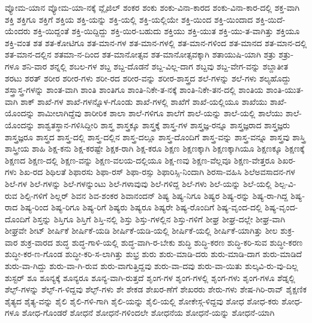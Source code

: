 {ವ್ಯೋಮ-ಯಾನ
ವ್ಯೋಮ-ಯಾ-ನಕ್ಕೆ
ವ್ಲೈಜಿಲ್
ಶಂಕರ
ಶಂಕು
ಶಂಕು-ವಿನಾ-ಕಾರದ
ಶಂಕು-ವಿನಾ-ಕಾರ-ದಲ್ಲಿ
ಶಕ್ತ-ವಾಗಿ
ಶಕ್ತಿ
ಶಕ್ತಿಗೂ
ಶಕ್ತಿಗೆ
ಶಕ್ತಿಯ
ಶಕ್ತಿ-ಯನ್ನು
ಶಕ್ತಿ-ಯಲ್ಲಿ
ಶಕ್ತಿ-ಯಲ್ಲಿಯೇ
ಶಕ್ತಿ-ಯಿಂದ
ಶಕ್ತಿ-ಯಿಂದಾದ
ಶಕ್ತಿ-ಯಿದೆ-ಯೆಂದರು
ಶಕ್ತಿ-ಯಿದ್ದಂತೆ
ಶಕ್ತಿ-ಯಿದ್ದಿದ್ದು
ಶಕ್ತಿ-ಯಿರ-ಬಹುದು
ಶಕ್ತಿಯು
ಶಕ್ತಿ-ಯುತ
ಶಕ್ತಿ-ಯು-ತ-ವಾಗಿತ್ತು
ಶಕ್ತಿಯೂ
ಶಕ್ತಿ-ವಂತ
ಶತ
ಶತ-ಕೋಟಿಗೂ
ಶತ-ಮಾನ-ಗಳ
ಶತ-ಮಾನ-ಗಳಲ್ಲಿ
ಶತ-ಮಾನ-ಗಳಿಂದ
ಶತ-ಮಾನದ
ಶತ-ಮಾನ-ದಲ್ಲಿ
ಶತ-ಮಾನ-ದಲ್ಲಿನ
ಶತಮಾ-ನ-ದಿಂದ
ಶತ-ಮಾನೋತ್ಸವ
ಶತ-ಮಾನೋತ್ಸವಕ್ಕಾಗಿ
ಶತಾಯುಷಿ-ಯಾಗಿ
ಶತ್ರು
ಶತ್ರು-ಗಳೂ
ಶನಿ-ವಾರ
ಶನ್ನಲ್ಲಿ
ಶಬಲ-ಗಳ
ಶಬ್ದ
ಶಬ್ದ-ದೊಡನೆ
ಶಬ್ದ-ವಿಲ್ಲ-ದಾಗ
ಶಬ್ದವು
ಶಬ್ದ-ವೇಗ-ವನ್ನು
ಶಬ್ದಾತೀತ
ಶರಟು
ಶರತ್
ಶರೀರ
ಶರೀರ-ಗಳು
ಶರೀ-ರದ
ಶರೀರ-ವನ್ನು
ಶರೀರ-ಶಾಸ್ತ್ರದ
ಶಲೆ-ಗಳನ್ನು
ಶಲೆ-ಗಳು
ಶಲ್ಯಹೊದ್ದು
ಶಸ್ತ್ರಾಸ್ತ್ರ-ಗಳನ್ನು
ಶಾಂತ-ವಾಗಿ
ಶಾಂತಿ
ಶಾಂತಿಗೂ
ಶಾಂತಿ-ನಿಕೇ-ತ-ನಕ್ಕೆ
ಶಾಂತಿ-ನಿಕೇ-ತನ-ದಲ್ಲಿ
ಶಾಂತಿಯ
ಶಾಂತಿ-ಯುತ-ವಾಗಿ
ಶಾಕ್
ಶಾಖೆ-ಗಳ
ಶಾಖೆ-ಗಳನ್ನೊಳ-ಗೊಂಡು
ಶಾಖೆ-ಗಳಲ್ಲಿ
ಶಾಖೆಗೆ
ಶಾಖೆ-ಯಲ್ಲಿಯೂ
ಶಾಖೆಯು
ಶಾಖೆ-ಯೊಂದನ್ನು
ಶಾಮೀಲಾಗಿದ್ದೆವು
ಶಾರೀರಿಕ
ಶಾಲಾ
ಶಾಲೆ-ಗಳಿಗೂ
ಶಾಲೆಗೆ
ಶಾಲೆ-ಯನ್ನು
ಶಾಲೆ-ಯಲ್ಲಿ
ಶಾಲೆಯು
ಶಾಲೆ-ಯೊಂದನ್ನು
ಶಾಶ್ವತಸ್ಥಾನ-ಗಳಿಸಿದ್ದೀರಿ
ಶಾಸ್ತ್ರ
ಶಾಸ್ತ್ರಕ್ಕೂ
ಶಾಸ್ತ್ರಕ್ಕೆ
ಶಾಸ್ತ್ರ-ಗಳ
ಶಾಸ್ತ್ರಜ್ಞ-ರನ್ನೂ
ಶಾಸ್ತ್ರಜ್ಞರಾದ
ಶಾಸ್ತ್ರಜ್ಞರು
ಶಾಸ್ತ್ರಜ್ಞರೂ
ಶಾಸ್ತ್ರದ
ಶಾಸ್ತ್ರ-ದಲ್ಲಿ
ಶಾಸ್ತ್ರ-ದಲ್ಲಿನ
ಶಾಸ್ತ್ರ-ದಲ್ಲೂ
ಶಾಸ್ತ್ರ-ದೊಂದಿಗೆ
ಶಾಸ್ತ್ರ-ವನ್ನು
ಶಾಸ್ತ್ರ-ವನ್ನೂ
ಶಾಸ್ತ್ರವು
ಶಾಸ್ತ್ರಿ
ಶಾಸ್ತ್ರೀಯ
ಶಾಹಿ
ಶಿಕ್ಷ-ಕನು
ಶಿಕ್ಷ-ಕರಷ್ಟೇ
ಶಿಕ್ಷಕ-ರಾಗಿ
ಶಿಕ್ಷ-ಕರೂ
ಶಿಕ್ಷಣ
ಶಿಕ್ಷಣಕ್ಕಾಗಿ
ಶಿಕ್ಷಣಕ್ಕಾಗಿಯೂ
ಶಿಕ್ಷಣಕ್ಕೂ
ಶಿಕ್ಷಣಕ್ಕೆ
ಶಿಕ್ಷಣದ
ಶಿಕ್ಷಣ-ದಲ್ಲಿ
ಶಿಕ್ಷಣ-ವನ್ನು
ಶಿಕ್ಷಣ-ವಲಯ-ದಲ್ಲಿಯೂ
ಶಿಕ್ಷ-ಣವು
ಶಿಕ್ಷಣ-ವೆಲ್ಲವೂ
ಶಿಕ್ಷಣ-ವೇತ್ತರೂ
ಶಿಖರ-ಗಳು
ಶಿಖ-ರದ
ಶಿಥಿಲತೆ
ಶಿಫಾರಸು
ಶಿಫಾ-ರಸ್
ಶಿಫಾ-ರಸ್ಸು
ಶಿಫಾರಿಸ್ಸಿ-ನಿಂದಾಗಿ
ಶಿರಸಾ-ವಹಿಸಿ
ಶಿಲೆಅವಸಾದನ-ಗಳ
ಶಿಲೆ-ಗಳ
ಶಿಲೆ-ಗಳನ್ನು
ಶಿಲೆ-ಗಳನ್ನುಂಟು
ಶಿಲೆ-ಗಳಾವುವು
ಶಿಲೆ-ಗಳಿದ್ದ
ಶಿಲೆ-ಗಳು
ಶಿಲೆ-ಯನ್ನು
ಶಿಲೆ-ಯಲ್ಲಿ
ಶಿಲ್ಪ-ವಿ-ರುವ
ಶಿಲ್ಪಿ-ಗಳಿಗೆ
ಶಿಲ್ಲರ್
ಶಿವನ
ಶಿವ-ಶಂಕರ
ಶಿವಾನಂದನ್
ಶಿಷ್ಯ
ಶಿಷ್ಯ-ನಿಗೂ
ಶಿಷ್ಯರ
ಶಿಷ್ಯ-ರನ್ನು
ಶಿಷ್ಯ-ರಾ-ಗಿದ್ದ
ಶಿಷ್ಯ-ರಾದ
ಶಿಷ್ಯ-ರಿಂದ
ಶಿಷ್ಯ-ರಿಗೂ
ಶಿಷ್ಯ-ರಿಗೆ
ಶಿಷ್ಯರು
ಶಿಷ್ಯರೂ
ಶಿಷ್ಯರೇ
ಶಿಷ್ಯ-ರೊಂದಿಗೆ
ಶಿಷ್ಯ-ವೃಂದ-ದಲ್ಲಿ
ಶಿಷ್ಯ-ವೃಂದ-ದೊಂದಿಗೆ
ಶಿಸ್ತನ್ನು
ಶಿಸ್ತಿಗೂ
ಶಿಸ್ತಿಗೆ
ಶಿಸ್ತಿ-ನಲ್ಲಿ
ಶಿಸ್ತು
ಶಿಸ್ತು-ಗಳಲ್ಲಿನ
ಶಿಸ್ತು-ಗಳಿಗೆ
ಶೀಘ್ರ
ಶೀಘ್ರ-ದಲ್ಲೇ
ಶೀಘ್ರ-ವಾಗಿ
ಶೀಘ್ರವೇ
ಶೀಟ್
ಶೀರ್ಷಿಕೆ
ಶೀರ್ಷಿಕೆ-ಯಡಿ
ಶೀರ್ಷಿಕೆ-ಯಡಿ-ಯಲ್ಲಿ
ಶೀರ್ಷಿಕೆ-ಯಲ್ಲಿ
ಶೀರ್ಷಿಕೆ-ಯಾಗಿತ್ತು
ಶೀಲ
ಶುಕ್ರ-ವಾರ
ಶುಕ್ರ-ವಾರದ
ಶುದ್ಧ
ಶುದ್ಧ-ಗಾಳಿ-ಯಲ್ಲಿ
ಶುದ್ಧ-ವಾಗಿ-ರ-ಬೇಕು
ಶುದ್ಧಿ
ಶುದ್ಧಿ-ಕರಣ
ಶುದ್ಧಿ-ಕರಿ-ಸುವ
ಶುದ್ಧೀ-ಕರಣ
ಶುದ್ಧೀ-ಕರ-ಣ-ಗೊಂಡ
ಶುದ್ಧೀ-ಕರಿ-ಸ-ಲಾಗಿತ್ತು
ಶುಭ್ರ
ಶುರು
ಶುರು-ಮಾಡಿ-ದರು
ಶುರು-ಮಾಡಿ-ದಾಗ
ಶುರು-ಮಾಡಿದೆ
ಶುರು-ವಾ-ಗಿದ್ದು
ಶುರು-ವಾ-ಗಿ-ರುವ
ಶುರು-ವಾಗುತ್ತಿದ್ದವು
ಶುರು-ವಾ-ದವು
ಶುರು-ವಾ-ಯಿತು
ಶುಲ್ಕವಿ-ರು-ವು-ದಿಲ್ಲ
ಶುಸ್ಟರ್
ಶೂ
ಶೂನ್ಯಕ್ಕೆ
ಶೂನ್ಯರೂ
ಶೂನ್ಯ-ವಾಗಿ-ರುತ್ತದೆ
ಶೃಂಗ-ಗಳ
ಶೃಂಗ-ಗಳಲ್ಲಿ
ಶೃಂಗ-ಗಳು
ಶೃಂಗ-ಗಳೂ
ಶೆಡ್ನಲ್ಲಿ
ಶೆಲ್ಫ್-ಗಳನ್ನು
ಶೆಲ್ಫ್-ಗ-ಳಿದ್ದವು
ಶೆಲ್ಫ್-ಗಳು
ಶೇ
ಶೇಕಡ
ಶೇಖರ-ಣೆಗೆ
ಶೇಖರರು
ಶೇರು-ಗಳು
ಶೇಷ-ಗಿರಿ-ರಾವ್
ಶೈಕ್ಷಣಿಕ
ಶೈತ್ಯದ
ಶೈತ್ಯ-ವನ್ನು
ಶೈಲಿ
ಶೈಲಿ-ಗಳಿ-ಗಾಗಿ
ಶೈಲಿ-ಯನ್ನು
ಶೈಲಿ-ಯಲ್ಲಿ
ಶೋಕೇಸ್ಗ-ಳಿದ್ದವು
ಶೋಧ
ಶೋಧ-ಕರು
ಶೋಧ-ಗಳೂ
ಶೋಧ-ಗೊಂಡರೆ
ಶೋಧನೆ
ಶೋಧನೆ-ಗಳಿಂದಲೇ
ಶೋಧನೆಯ
ಶೋಧನೆ-ಯನ್ನು
ಶೋಧನೆ-ಯಾಗಿ
}
